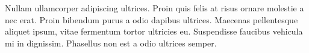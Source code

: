 Nullam ullamcorper adipiscing ultrices. Proin quis felis at risus ornare molestie a nec erat. Proin bibendum purus a odio dapibus ultrices. Maecenas pellentesque aliquet ipsum, vitae fermentum tortor ultricies eu. Suspendisse faucibus vehicula mi in dignissim. Phasellus non est a odio ultrices semper.
